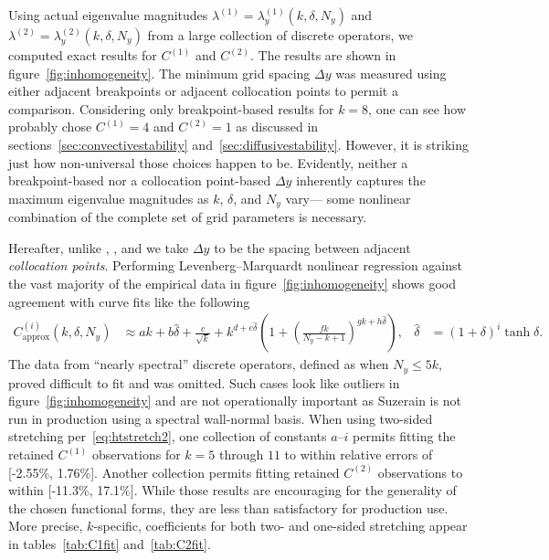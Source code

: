 \documentclass[letterpaper,11pt,nointlimits,reqno,draft]{amsbook}
\begin{document}
Using actual eigenvalue magnitudes
$\lambda^{(1)}=\lambda^{(1)}_y\!\left(k,\delta,N_y\right)$ and
$\lambda^{(2)}=\lambda^{(2)}_y\!\left(k,\delta,N_y\right)$ from a large
collection of discrete operators, we computed exact results for $C^{(1)}$ and
$C^{(2)}$.  The results are shown in figure~\ref{fig:inhomogeneity}.  The
minimum grid spacing $\Delta{}y$ was measured using either adjacent breakpoints
or adjacent collocation points to permit a comparison.  Considering only
breakpoint-based results for $k=8$, one can see how \citet{Venugopal2003}
probably chose $C^{(1)}=4$ and $C^{(2)}=1$ as discussed in
sections~\ref{sec:convectivestability} and~\ref{sec:diffusivestability}.
However, it is striking just how non-universal those choices happen to be.
Evidently, neither a breakpoint-based nor a collocation point-based $\Delta{}y$
inherently captures the maximum eigenvalue magnitudes as $k$, $\delta$, and
$N_y$ vary--- some nonlinear combination of the complete set of grid parameters
is necessary.

Hereafter, unlike \citeauthor{Guarini1998}, \citeauthor{Kwok2002}, and
\citeauthor{Venugopal2003} we take $\Delta{}y$ to be the spacing between
adjacent \emph{collocation points}.  Performing Levenberg--Marquardt nonlinear
regression against the vast majority of the empirical data in
figure~\ref{fig:inhomogeneity} shows good agreement with curve fits like the
following
\begin{align}
  \label{eq:Cfit}
  C_\text{approx}^{(i)}\!\left(k,\delta,N_y\right)
  &\approx
    a k
  + b \hat\delta
  + \frac{c}{\sqrt{k}}
  + k^{d + e \hat\delta} \left(
        1 + \left(\frac{f k}{N_y - k + 1}\right)^{g k + h \hat\delta}
    \right)
  ,
  &
  \hat\delta &= \left(1+\delta\right)^i \tanh \delta
  .
\end{align}
The data from ``nearly spectral'' discrete operators, defined as when $N_y \leq
5 k$, proved difficult to fit and was omitted.  Such cases look like outliers
in figure~\ref{fig:inhomogeneity} and are not operationally important as
Suzerain is not run in production using a spectral wall-normal basis.  When
using two-sided stretching per~\eqref{eq:htstretch2}, one collection of
constants $a$--$i$ permits fitting the retained $C^{(1)}$ observations for
$k=5$ through $11$ to within relative errors of [-2.55\%, 1.76\%].  Another
collection permits fitting retained $C^{(2)}$ observations to within [-11.3\%,
17.1\%].  While those results are encouraging for the generality of the chosen
functional forms, they are less than satisfactory for production use.  More
precise, $k$-specific, coefficients for both two- and one-sided stretching
appear in tables~\ref{tab:C1fit} and~\ref{tab:C2fit}.
\end{document}
